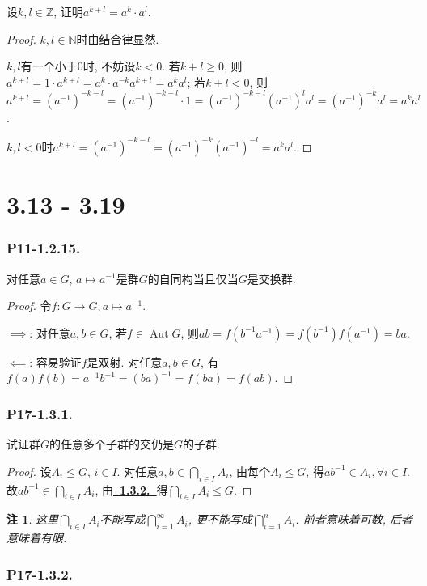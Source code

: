 \documentclass[12pt, a4paper, fontset=windows]{ctexart}
\newcommand{\N}{\mathbb{N}}
\newcommand{\Z}{\mathbb{Z}}
\newcommand{\Aut}{\operatorname{Aut}}
\newcommand{\myref}[2][]{\hyperref[#1]{\bf\color{blue}\ {#2}\ }}
\newtheorem*{remark}{注}
\begin{document}
设$k,l\in\Z$, 证明$a^{k+l}=a^k\cdot a^l$. 

\begin{proof}
$k,l\in\N$时由结合律显然. 

$k,l$有一个小于$0$时, 不妨设$k<0$. 若$k+l\ge 0$, 则
$a^{k+l}=1\cdot a^{k+l}=a^{k}\cdot a^{-k}a^{k+l}=a^ka^l$; 
若$k+l<0$, 则$a^{k+l}=(a^{-1})^{-k-l}=(a^{-1})^{-k-l}\cdot 1
=(a^{-1})^{-k-l}(a^{-1})^la^l=(a^{-1})^{-k}a^l=a^ka^l$. 

$k,l<0$时$a^{k+l}=(a^{-1})^{-k-l}=(a^{-1})^{-k}(a^{-1})^{-l}=a^ka^l$. 
\end{proof}

\clearpage
\part{3.13 - 3.19}

\section*{P11-1.2.15.}

对任意$a\in G$, $a\mapsto a^{-1}$是群$G$的自同构当且仅当$G$是交换群. 

\begin{proof}
令$f:G\to G,a\mapsto a^{-1}$.

$\implies$: 
对任意$a,b\in G$, 若$f\in\Aut G$, 则$ab=f(b^{-1}a^{-1})=f(b^{-1})f(a^{-1})=ba$. 

$\impliedby$: 
容易验证$f$是双射. 对任意$a,b\in G$, 有$f(a)f(b)=a^{-1}b^{-1}=(ba)^{-1}=f(ba)=f(ab)$. 
\end{proof}

\section*{P17-1.3.1.}

试证群$G$的任意多个子群的交仍是$G$的子群. 

\begin{proof}
设$A_i\le G$, $i\in I$. 对任意$a,b\in\bigcap_{i\in I}A_i$, 
由每个$A_i\le G$, 得$ab^{-1}\in A_i,\forall i\in I$. 
故$ab^{-1}\in\bigcap_{i\in I}A_i$, 
由\myref[subgroup]{1.3.2.}得$\bigcap_{i\in I}A_i\le G$. 
\end{proof}

\begin{remark}
这里$\bigcap_{i\in I}A_i$不能写成$\bigcap^\infty_{i=1}A_i$, 
更不能写成$\bigcap^n_{i=1}A_i$. 前者意味着可数, 后者意味着有限. 
\end{remark}

\section*{P17-1.3.2.}
\label{subgroup}
\end{document}
